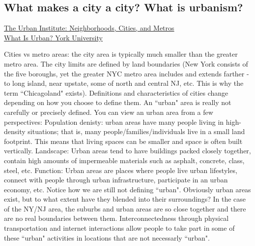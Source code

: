 \documentclass{article}
\begin{document}
        \subsection{What makes a city a city? What is urbanism?}
        \small{\href{https://www.urban.org/urban-wire/what-defines-city}{The Urban Institute: Neighborhoods, Cities, and Metros}}\\
        \small{\href{https://www.yorku.ca/anderson/Intro%20Urban%20Studies/Unit1/what_is_urban.htm}{What Is Urban? York University}}
        \normalsize
        \begin{outline}
            \1 Cities vs metro areas: the city area is typically much smaller than the greater metro area. The city limits are defined by land boundaries (New York consists of the five boroughs, yet the greater NYC metro area includes and extends farther - to long island, near upstate, some of north and central NJ, etc. This is why the term ``Chicagoland" exists). 
            \1 Definitions and characteristics of cities change depending on how you choose to define them. 
            \1 An ``urban" area is really not carefully or precisely defined. You can view an urban area from a few perspectives:
                \2 Population denisty: urban areas have many people living in high-density situations; that is, many people/families/individuals live in a small land footprint. This means that living spaces can be smaller and space is often built vertically. 
                \2 Landscape: Urban areas tend to have buildings packed closely together, contain high amounts of impermeable materials such as asphalt, concrete, class, steel, etc. 
                \2 Function: Urban areas are places where people live urban lifestyles, connect with people through urban infrastructure, participate in an urban economy, etc. Notice how we are still not defining ``urban". 
            \1 Obviously urban areas exist, but to what extent have they blended into their surroundings? In the case of the NY/NJ area, the suburbs and urban areas are so close together and there are no real boundaries between them. Interconnectedness through physical transportation and internet interactions allow people to take part in some of these ``urban" activities in locations that are not necessarly ``urban". 
        \end{outline}
\end{document}
